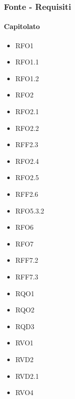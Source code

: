 \subsubsection{Fonte - Requisiti}

\paragraph{Capitolato}
\quad
\begin{multicols}{3}
    \begin{itemize}
        \item RFO1
        \item RFO1.1
        \item RFO1.2
        \item RFO2
        \item RFO2.1
        \item RFO2.2
        \item RFF2.3
        \item RFO2.4
        \item RFO2.5
        \item RFF2.6
        \item RFO5.3.2
        \item RFO6
        \item RFO7
        \item RFF7.2
        \item RFF7.3
        \item RQO1
        \item RQO2
        \item RQD3
        \item RVO1
        \item RVD2
        \item RVD2.1
        \item RVO4
    \end{itemize}
\end{multicols}


